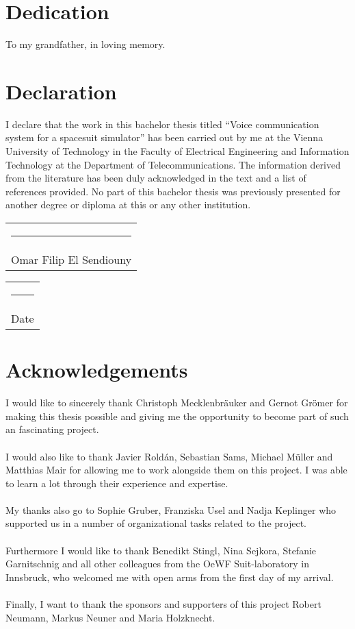 \documentclass[12pt, twoside]{report}
\begin{document}

 

\chapter*{Dedication}
To my grandfather, in loving memory.

\chapter*{Declaration}
I declare that the work in this bachelor thesis titled ``Voice communication system for a spacesuit simulator'' has been carried out by me at the Vienna University of Technology in the Faculty of Electrical Engineering and Information Technology at the Department of Telecommunications. The information derived from the literature has been duly acknowledged in the text and a list of references provided. No part of this bachelor thesis was previously presented for another degree or diploma at this or any other institution.

\vspace*{4em}\noindent
\hfill%
\begin{tabular}[t]{c}
	\rule{10em}{0.4pt}\\ Omar Filip El Sendiouny
\end{tabular}%
\hfill%
\begin{tabular}[t]{c}
  	\rule{10em}{0.4pt}\\ Date
\end{tabular}%
\hfill\strut

\chapter*{Acknowledgements}
I would like to sincerely thank Christoph Mecklenbräuker and Gernot Grömer for making this thesis possible and giving me the opportunity to become part of such an fascinating project.
\\\\
\indent I would also like to thank Javier Roldán, Sebastian Sams, Michael Müller and Matthias Mair for allowing me to work alongside them on this project. I was able to learn a lot through their experience and expertise.
\\\\
\indent My thanks also go to Sophie Gruber, Franziska Usel and Nadja Keplinger who supported us in a number of organizational tasks related to the project.
\\\\
\indent Furthermore I would like to thank Benedikt Stingl, Nina Sejkora, Stefanie Garnitschnig and all other colleagues from the OeWF Suit-laboratory in Innsbruck, who welcomed me with open arms from the first day of my arrival. 
\\\\
\indent Finally, I want to thank the sponsors and supporters of this project Robert Neumann, Markus Neuner and Maria Holzknecht. 
\end{document}
